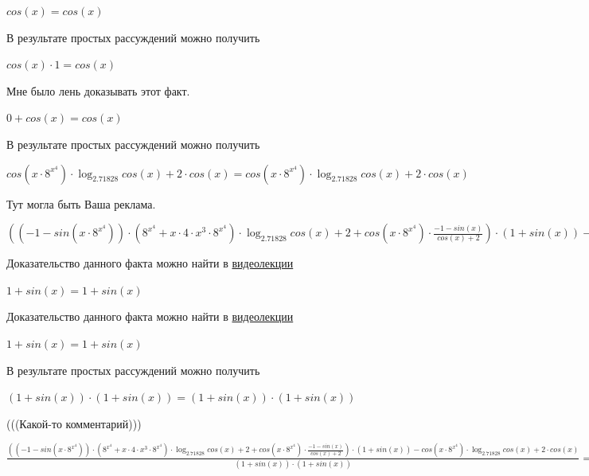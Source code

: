 \documentclass[12pt,a4paper,fleqn]{article}
\theoremstyle{definition}
\begin{document}
$cos( x ) = cos( x )$

В результате простых рассуждений можно получить 

$cos( x ) \cdot  1  = cos( x )$

Мне было лень доказывать этот факт.

$ 0  + cos( x ) = cos( x )$

В результате простых рассуждений можно получить 

$cos( x  \cdot { 8 }^{{ x }^{ 4 }}) \cdot \log_{ 2.71828 }{cos( x ) +  2 } \cdot cos( x ) = cos( x  \cdot { 8 }^{{ x }^{ 4 }}) \cdot \log_{ 2.71828 }{cos( x ) +  2 } \cdot cos( x )$

Тут могла быть Ваша реклама. 

$(( -1  - sin( x  \cdot { 8 }^{{ x }^{ 4 }})) \cdot ({ 8 }^{{ x }^{ 4 }} +  x  \cdot  4  \cdot { x }^{ 3 } \cdot { 8 }^{{ x }^{ 4 }}) \cdot \log_{ 2.71828 }{cos( x ) +  2 } + cos( x  \cdot { 8 }^{{ x }^{ 4 }}) \cdot \frac{ -1  - sin( x )}{cos( x ) +  2 }
) \cdot ( 1  + sin( x )) - cos( x  \cdot { 8 }^{{ x }^{ 4 }}) \cdot \log_{ 2.71828 }{cos( x ) +  2 } \cdot cos( x ) = (( -1  - sin( x  \cdot { 8 }^{{ x }^{ 4 }})) \cdot ({ 8 }^{{ x }^{ 4 }} +  x  \cdot  4  \cdot { x }^{ 3 } \cdot { 8 }^{{ x }^{ 4 }}) \cdot \log_{ 2.71828 }{cos( x ) +  2 } + cos( x  \cdot { 8 }^{{ x }^{ 4 }}) \cdot \frac{ -1  - sin( x )}{cos( x ) +  2 }
) \cdot ( 1  + sin( x )) - cos( x  \cdot { 8 }^{{ x }^{ 4 }}) \cdot \log_{ 2.71828 }{cos( x ) +  2 } \cdot cos( x )$

Доказательство данного факта можно найти в \href{https://www.youtube.com/watch?v=dQw4w9WgXcQ}{видеолекции} 

$ 1  + sin( x ) =  1  + sin( x )$

Доказательство данного факта можно найти в \href{https://www.youtube.com/watch?v=dQw4w9WgXcQ}{видеолекции} 

$ 1  + sin( x ) =  1  + sin( x )$

В результате простых рассуждений можно получить 

$( 1  + sin( x )) \cdot ( 1  + sin( x )) = ( 1  + sin( x )) \cdot ( 1  + sin( x ))$

(((Какой-то комментарий))) 

$\frac{(( -1  - sin( x  \cdot { 8 }^{{ x }^{ 4 }})) \cdot ({ 8 }^{{ x }^{ 4 }} +  x  \cdot  4  \cdot { x }^{ 3 } \cdot { 8 }^{{ x }^{ 4 }}) \cdot \log_{ 2.71828 }{cos( x ) +  2 } + cos( x  \cdot { 8 }^{{ x }^{ 4 }}) \cdot \frac{ -1  - sin( x )}{cos( x ) +  2 }
) \cdot ( 1  + sin( x )) - cos( x  \cdot { 8 }^{{ x }^{ 4 }}) \cdot \log_{ 2.71828 }{cos( x ) +  2 } \cdot cos( x )}{( 1  + sin( x )) \cdot ( 1  + sin( x ))}
 = \frac{(( -1  - sin( x  \cdot { 8 }^{{ x }^{ 4 }})) \cdot ({ 8 }^{{ x }^{ 4 }} +  x  \cdot  4  \cdot { x }^{ 3 } \cdot { 8 }^{{ x }^{ 4 }}) \cdot \log_{ 2.71828 }{cos( x ) +  2 } + cos( x  \cdot { 8 }^{{ x }^{ 4 }}) \cdot \frac{ -1  - sin( x )}{cos( x ) +  2 }
) \cdot ( 1  + sin( x )) - cos( x  \cdot { 8 }^{{ x }^{ 4 }}) \cdot \log_{ 2.71828 }{cos( x ) +  2 } \cdot cos( x )}{( 1  + sin( x )) \cdot ( 1  + sin( x ))}
$
\end{document}
